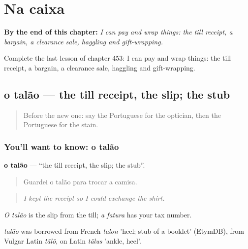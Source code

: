 
\chapter{Na caixa}
\label{ch:pt-na-caixa}

\begin{chapteropening}
\textbf{By the end of this chapter:} \emph{I can pay and wrap things: the till receipt, a bargain, a clearance sale, haggling and gift-wrapping.}

Complete the last lesson of chapter 453: I can pay and wrap things: the till receipt, a bargain, a clearance sale, haggling and gift-wrapping.
\end{chapteropening}

\section[o talão]{o talão — the till receipt, the slip; the stub}

\label{lesson:PT-C453-talao}



\begin{quote}
Before the new one: say the Portuguese for the optician, then the Portuguese for the stain.
\end{quote}

\subsection*{You'll want to know: o talão}
\textbf{o talão} — \textquotedblleft{}the till receipt, the slip; the stub\textquotedblright{}.

\begin{quote}
Guardei o talão para trocar a camisa.
\end{quote}

\begin{quote}
\emph{I kept the receipt so I could exchange the shirt.}
\end{quote}

\emph{O talão} is the slip from the till; \emph{a fatura} has your tax number.

\begin{cousinweb}
\emph{talão} was borrowed from French \emph{talon} 'heel; stub of a booklet' (EtymDB), from Vulgar Latin \emph{tālō}, on Latin \emph{tālus} 'ankle, heel'.
\end{cousinweb}

